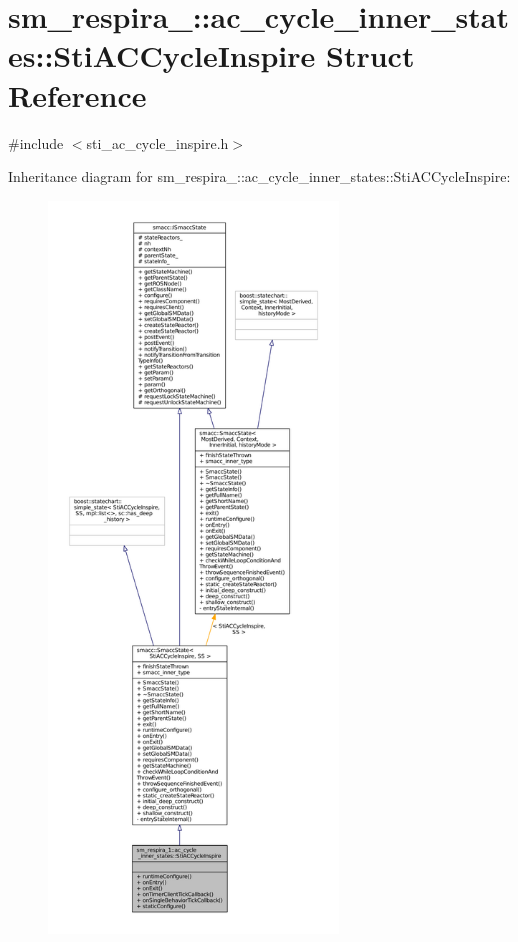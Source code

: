 \hypertarget{structsm__respira__1_1_1ac__cycle__inner__states_1_1StiACCycleInspire}{}\section{sm\+\_\+respira\+\_\+:\+:ac\+\_\+cycle\+\_\+inner\+\_\+states\+:\+:Sti\+A\+C\+Cycle\+Inspire Struct Reference}
\label{structsm__respira__1_1_1ac__cycle__inner__states_1_1StiACCycleInspire}


{\ttfamily \#include $<$sti\+\_\+ac\+\_\+cycle\+\_\+inspire.\+h$>$}



Inheritance diagram for sm\+\_\+respira\+\_\+:\+:ac\+\_\+cycle\+\_\+inner\+\_\+states\+:\+:Sti\+A\+C\+Cycle\+Inspire\+:
\nopagebreak
\begin{figure}[H]
\begin{center}
\leavevmode
\includegraphics[height=550pt]{structsm__respira__1_1_1ac__cycle__inner__states_1_1StiACCycleInspire__inherit__graph}
\end{center}
\end{figure}


